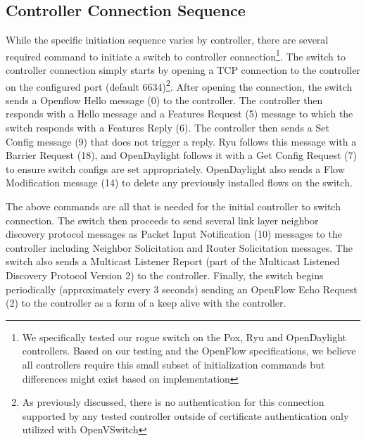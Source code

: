 \subsection {Controller Connection Sequence}
While the specific initiation sequence varies by controller, there are several required command to initiate a switch to controller connection\footnote{We specifically tested our rogue switch on the Pox, Ryu and OpenDaylight controllers. Based on our testing and the OpenFlow specifications, we believe all controllers require this small subset of initialization commands but differences might exist based on implementation}. The switch to controller connection simply starts by opening a TCP connection to the controller on the configured port (default 6634)\footnote{As previously discussed, there is no authentication for this connection supported by any tested controller outside of certificate authentication only utilized with OpenVSwitch}.  After opening the connection, the switch sends a Openflow Hello message (0) to the controller. The controller then responds with a Hello message and a Features Request (5) message to which the switch responds with a  Features Reply (6). The controller then sends a Set Config message (9) that does not trigger a reply. Ryu follows this message with a Barrier Request (18), and OpenDaylight follows it with a  Get Config Request (7) to ensure switch configs are set appropriately. OpenDaylight also sends a Flow Modification message (14) to delete any previously installed flows on the switch.

The above commands are all that is needed for the initial controller to switch connection. The switch then proceeds to send several link layer neighbor discovery protocol messages as Packet Input Notification (10) messages to the controller including  Neighbor Solicitation and Router Solicitation messages. The switch also sends a Multicast Listener Report (part of the Multicast Listened Discovery Protocol Version 2) to the controller. Finally, the switch begins periodically (approximately every 3 seconds) sending an OpenFlow Echo Request (2) to the controller as a form of a keep alive with the controller.

